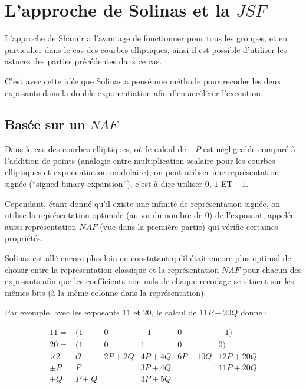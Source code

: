 \documentclass[12pt, a4paper]{memoir}
\begin{document}
\section{L'approche de Solinas et la $JSF$}

L'approche de Shamir a l'avantage de fonctionner pour tous les groupes, et en particulier dans le cas des courbes 
elliptiques, ainsi il est possible d'utiliser les astuces des parties précédentes dans ce cas.

C'est avec cette idée que Solinas a pensé une méthode pour recoder les deux exposants dans la double exponentiation 
afin d'en accélérer l'execution.

\subsection{Basée sur un $NAF$}

Dans le cas des courbes elliptiques, où le calcul de $-P$ est négligeable comparé à l'addition de points
(analogie entre multiplication scalaire pour les courbes elliptiques et exponentiation modulaire),
on peut utiliser une représentation signée (``signed binary expansion''), c'est-à-dire utiliser $0$, $1$ ET $-1$.

Cependant, étant donné qu'il existe une infinité de représentation signée, on utilise la représentation optimale
(au vu du nombre de $0$) de l'exposant, appelée aussi représentation $NAF$ (vue dans la première partie) qui 
vérifie certaines propriétés.

Solinas est allé encore plus loin en constatant qu'il était encore plus optimal de choisir entre la représentation classique 
et la représentation $NAF$ pour chacun des exposants afin que les coefficients non nuls de chaque recodage se situent
sur les mêmes bits (à la même colonne dans la représentation).

Par exemple, avec les exposants $11$ et $20$, le calcul de $11P + 20Q$ donne :

  $$\begin{array}{ccccccc}
  11 = & (1 & 0 & -1 & 0 & -1) \\
  20 = & (1 & 0 & 1 & 0 & 0) \\
  \times 2 & \mathcal{O} & 2P + 2Q & 4P + 4Q & 6P + 10Q & 12P + 20Q \\
  \pm P      & P           & \,      & 3P + 4Q &    \,    & 11P + 20Q \\
  \pm Q      & P + Q       & \,      & 3P + 5Q &    \,    & \,
  \end{array}$$
\end{document}

